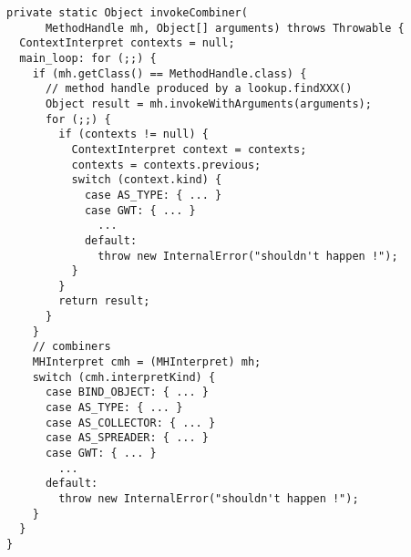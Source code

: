{\scriptsize \begin{verbatim}
private static Object invokeCombiner(
      MethodHandle mh, Object[] arguments) throws Throwable {
  ContextInterpret contexts = null;
  main_loop: for (;;) {
    if (mh.getClass() == MethodHandle.class) {
      // method handle produced by a lookup.findXXX()
      Object result = mh.invokeWithArguments(arguments);
      for (;;) {
        if (contexts != null) {
          ContextInterpret context = contexts;
          contexts = contexts.previous;
          switch (context.kind) {
            case AS_TYPE: { ... }
            case GWT: { ... }
              ...
            default:
              throw new InternalError("shouldn't happen !");
          }
        }
        return result;
      }
    }
    // combiners
    MHInterpret cmh = (MHInterpret) mh;
    switch (cmh.interpretKind) {
      case BIND_OBJECT: { ... }
      case AS_TYPE: { ... }
      case AS_COLLECTOR: { ... }
      case AS_SPREADER: { ... }
      case GWT: { ... }
        ...
      default:
        throw new InternalError("shouldn't happen !");
    }
  }
}
\end{verbatim} }
